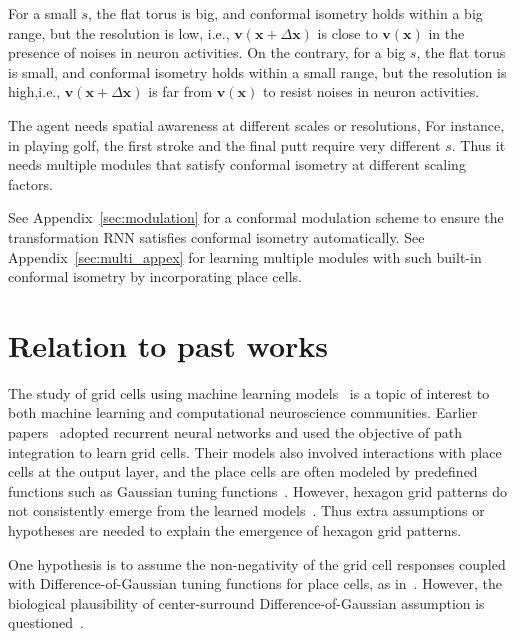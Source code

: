 \documentclass{article}
\def\vv{{\bm{v}}}
\def\vx{{\bm{x}}}
\begin{document}
For a small $s$, the flat torus is big, and conformal isometry holds within a big range, but the resolution is low, i.e., $\vv(\vx+\Delta \vx)$ is close to $\vv(\vx)$ in the presence of noises in neuron activities. On the contrary, for a big $s$, the flat torus is small, and conformal isometry holds within a small range, but the resolution is high,i.e., $\vv(\vx+\Delta \vx)$ is far from $\vv(\vx)$ to resist noises in neuron activities. 

The agent needs spatial awareness at different scales or resolutions, For instance, in playing golf, the first stroke and the final putt require very different $s$. Thus it needs multiple modules that satisfy conformal isometry at different scaling factors. 

See Appendix~\ref{sec:modulation} for a conformal modulation scheme to ensure the transformation RNN satisfies conformal isometry automatically. See Appendix~\ref{sec:multi_appex} for learning multiple modules with such built-in conformal isometry by incorporating place cells. 




\section{Relation to past works}

The study of grid cells using machine learning models~\citep{cueva2018emergence,banino2018vector,sorscher2019unified,whittington2020tolman,Nayebi2021} is a topic of interest to both machine learning and computational neuroscience communities. Earlier papers~\citep{cueva2018emergence,banino2018vector} adopted recurrent neural networks and used the objective of path integration to learn grid cells. Their models also involved interactions with place cells at the output layer, and the place cells are often modeled by predefined functions such as Gaussian tuning functions~\citep{cueva2018emergence, gao2021,xu2022conformal}. However, hexagon grid patterns do not consistently emerge from the learned models~\citep{Schaeffer2022}. Thus extra assumptions or hypotheses are needed to explain the emergence of hexagon grid patterns. 

One hypothesis is to assume the non-negativity of the grid cell responses coupled with Difference-of-Gaussian tuning functions for place cells, as in~\citep{sorscher2019unified,Nayebi2021}. However, the biological plausibility of center-surround Difference-of-Gaussian assumption is questioned~\citep{Schaeffer2022}. 
\end{document}
